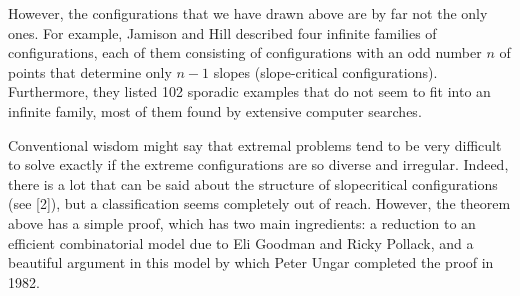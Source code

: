 \documentclass[a4paper]{article}
\begin{document}
\noindent
However, the configurations that we have drawn above are by far not the only ones. For example, Jamison and Hill described four infinite families of configurations, each of them consisting of configurations with an odd number $n$ of points that determine only $n - 1$ slopes (slope-critical configurations). Furthermore, they listed 102 sporadic examples that do not seem to fit into an infinite family, most of them found by extensive computer searches.

\noindent
Conventional wisdom might say that extremal problems tend to be very difficult to solve exactly if the extreme configurations are so diverse and irregular. Indeed, there is a lot that can be said about the structure of slopecritical configurations (see [2]), but a classification seems completely out of reach. However, the theorem above has a simple proof, which has two main ingredients: a reduction to an efficient combinatorial model due to Eli Goodman and Ricky Pollack, and a beautiful argument in this model by which Peter Ungar completed the proof in 1982.
\end{document}
